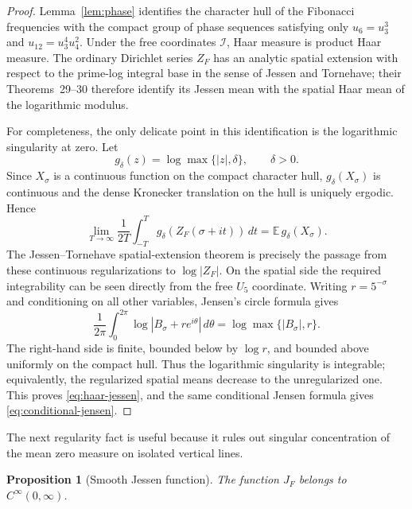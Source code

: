\documentclass[11pt]{article}
\newtheorem{proposition}[theorem]{Proposition}
\theoremstyle{remark}
\newcommand{\ZF}{Z_F}
\newcommand{\JF}{J_F}
\begin{document}
\begin{proof}
Lemma~\ref{lem:phase} identifies the character hull of the Fibonacci frequencies with the compact group of phase sequences satisfying only
$u_6=u_3^3$ and $u_{12}=u_3^4u_4^2$.  Under the free coordinates $\mathcal I$, Haar measure is product Haar measure.  The ordinary Dirichlet series $\ZF$ has an analytic spatial extension with respect to the prime-log integral base in the sense of Jessen and Tornehave; their Theorems~29--30 \cite{JessenTornehave1945} therefore identify its Jessen mean with the spatial Haar mean of the logarithmic modulus.

For completeness, the only delicate point in this identification is the logarithmic singularity at zero.  Let
\[
g_\delta(z)=\log\max\{|z|,\delta\},\qquad \delta>0.
\]
Since $X_\sigma$ is a continuous function on the compact character hull, $g_\delta(X_\sigma)$ is continuous and the dense Kronecker translation on the hull is uniquely ergodic.  Hence
\[
\lim_{T\to\infty}\frac1{2T}\int_{-T}^{T}
 g_\delta(\ZF(\sigma+it))\,dt
=\mathbb E\,g_\delta(X_\sigma).
\]
The Jessen--Tornehave spatial-extension theorem is precisely the passage from these continuous regularizations to $\log|\ZF|$.  On the spatial side the required integrability can be seen directly from the free $U_5$ coordinate.  Writing $r=5^{-\sigma}$ and conditioning on all other variables, Jensen's circle formula gives
\[
\frac1{2\pi}\int_0^{2\pi}\log|B_\sigma+re^{i\theta}|\,d\theta
=\log\max\{|B_\sigma|,r\}.
\]
The right-hand side is finite, bounded below by $\log r$, and bounded above uniformly on the compact hull.  Thus the logarithmic singularity is integrable; equivalently, the regularized spatial means decrease to the unregularized one.  This proves \eqref{eq:haar-jessen}, and the same conditional Jensen formula gives \eqref{eq:conditional-jensen}.
\end{proof}

The next regularity fact is useful because it rules out singular concentration of the mean zero measure on isolated vertical lines.

\begin{proposition}[Smooth Jessen function]\label{prop:jessen-smooth}
The function $\JF$ belongs to $C^\infty(0,\infty)$.
\end{proposition}
\end{document}
